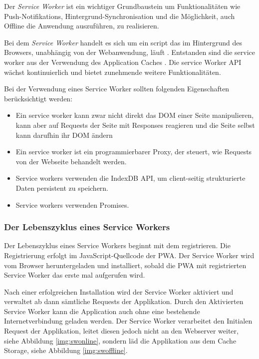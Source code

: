 Der \textit{Service Worker} ist ein wichtiger Grundbaustein um Funktionalitäten wie Push-Notifikations, Hintergrund-Synchronisation und die Möglichkeit, auch Offline die Anwendung auszuführen, zu realisieren. 

Bei dem \textit{Service Worker} handelt es sich um ein script das im Hintergrund des Browsers, unabhängig von der Webanwendung, läuft \cite{Gaunt2021}. Entstanden sind die service worker aus der Verwendung des Application Caches . Die service Worker \ac{API} wächst kontinuierlich und bietet zunehmende weitere Funktionalitäten.

Bei der Verwendung eines Service Worker sollten folgenden Eigenschaften berücksichtigt werden: 
\begin{itemize}
    \item Ein service worker kann zwar nicht direkt das \ac{DOM} einer Seite manipulieren, kann aber auf Requests der Seite mit Responses reagieren und die Seite selbst kann darufhin ihr DOM ändern
    \item Ein service worker ist ein \glqq programmierbarer\grqq{} Proxy, der steuert, wie Requests von der Webseite behandelt werden.
    \item Service workers verwenden die IndexDB API, um client-seitig strukturierte Daten persistent zu speichern.
    \item Service workers verwenden Promises. 
\end{itemize}

\subsubsection{Der Lebenszyklus eines Service Workers}

Der Lebenszyklus eines Service Workers beginnt mit dem registrieren. Die Registrierung erfolgt im JavaScript-Quellcode der PWA. 
Der Service Worker wird vom Browser heruntergeladen und installiert, sobald die PWA mit registrierten Service Worker das erste mal aufgerufen wird. 

Nach einer erfolgreichen Installation wird der Service Worker aktiviert und verwaltet ab dann sämtliche Requests der Applikation. 
Durch den Aktivierten Service Worker kann die Application auch ohne eine bestehende Internetverbindung geladen werden. Der Service Worker verarbeitet den Initialen Request der Applikation, leitet diesen jedoch nicht an den Webserver weiter, siehe Abbildung \ref{img:swonline}, sondern läd die Applikation aus dem Cache Storage, siehe Abbildung \ref{img:swoffline}.

